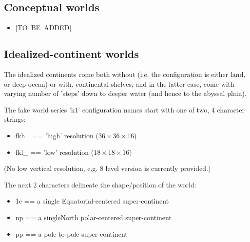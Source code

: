 %
\subsection{Conceptual worlds}

\small\begin{itemize}[noitemsep]
\vspace{1mm}
\item \textsf{\footnotesize } [TO\ BE\ ADDED]
\end{itemize}\normalsize
\vspace{1mm}

%
\subsection{Idealized-continent worlds}

The idealized continents come both without (i.e. the configuration is either land, or deep ocean) or with, continental shelves, and in the latter case, come with varying number of 'steps' down to deeper water (and hence to the abyssal plain).

The fake world series 'k1' configuration names start with one of two, 4 character strings:
\begin{itemize}[noitemsep]
\vspace{1mm}
\item \textsf{\footnotesize fkh\_} == 'high' resolution (\(36\times36\times16\))
\item \textsf{\footnotesize fkl\_} == 'low' resolution (\(18\times18\times16\))
\end{itemize}
\vspace{1mm}
\noindent (No low vertical resolution, e.g. \(8\) level version is currently provided.)
\vspace{1mm}

The next 2 characters delineate the shape/position of the world:
\begin{itemize}[noitemsep]
\vspace{1mm}
\item \textsf{\footnotesize 1e} == a single Equatorial-centered super-continent
\item \textsf{\footnotesize np} == a singleNorth polar-centered super-continent
\item \textsf{\footnotesize pp} == a pole-to-pole super-continent
\end{itemize}
\vspace{2mm}

